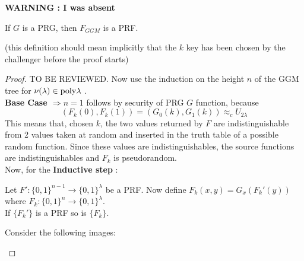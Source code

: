 \textbf{WARNING : I was absent} 
\begin{theorem}
    If $G$ is a PRG, then $F_{GGM}$ is a PRF.
\end{theorem}
(this definition should mean implicitly that the $k$ key has been chosen by the
challenger before the proof starts)
\begin{proof} TO BE REVIEWED.
    Now use the induction on the height $n$ of the GGM tree for $\nu(\lambda)
    \in \mathrm{poly}{\lambda} $ .\\
    
    \textbf{Base Case $\Rightarrow n=1$} follows by security of PRG $G$ function,
    because
    \[
        (F_{k}(0), F_{k}(1))=(G_{0}(k), G_{1}(k)) \approx_{c} U_{2\lambda}
    \]
    This means that, chosen $k$, the two values returned by $F$ are
    indistinguishable from 2 values taken at random and inserted in the
    truth table of a possible random function. Since these values are
    indistinguishables, the source functions are indistinguishables and $F_{k}$
    is pseudorandom.\\
    
    Now, for the \textbf{Inductive step} :\\
    \begin{lemma}
       Let $F':\{0,1\}^{n-1} \to \{0,1\}^{\lambda} $ be a PRF.
       Now define $F_{k}(x,y)=G_{x}(F_{k}'(y))$ where $F_{k}:\{0,1\}^{n} \to
       \{0,1\}^{\lambda} $.\\
       If $\{F_{k}'\}$ is a PRF so is $ \{F_{k}\}$.
    \end{lemma}
    
    Consider the following images:

    
    \newpage
    \begin{figure}[h!]
       \centering
       \sdinit{}
\end{figure}
\end{proof}
